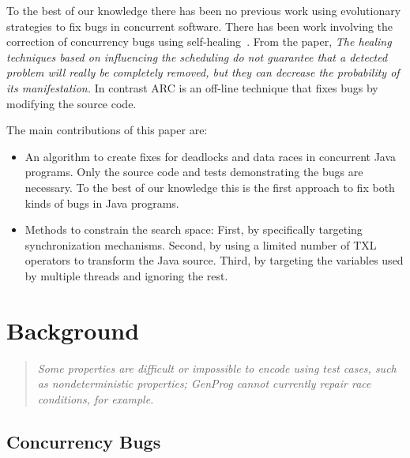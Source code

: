 \documentclass{llncs}
\begin{document}
To the best of our knowledge there has been no previous work using evolutionary
strategies to fix bugs in concurrent software. There has been work involving
the correction of concurrency bugs using self-healing~\cite{LVK08}. From the
paper, \textit{The healing techniques based on influencing the scheduling do
not guarantee that a detected problem will really be completely removed, but
they can decrease the probability of its manifestation.} In contrast ARC is an
off-line technique that fixes bugs by modifying the source code.

The main contributions of this paper are:

\begin{itemize}

\item An algorithm to create fixes for deadlocks and data races in concurrent Java
programs. Only the source code and tests demonstrating the bugs are necessary.
To the best of our knowledge this is the first approach to fix both kinds of
bugs in Java programs.

\item Methods to constrain the search space: First, by specifically targeting
synchronization mechanisms. Second, by using a limited number of TXL operators
to transform the Java source.  Third, by targeting the variables used by multiple
threads and ignoring the rest.

\end{itemize}

\section{Background}
\label{sec:background}

\begin{quote}
\textit{Some properties are difficult or impossible to encode using test cases,
such as nondeterministic properties; GenProg cannot currently repair race
conditions, for example.}~\cite{GNFW11}
\end{quote}


\subsection{Concurrency Bugs}
\label{sec:concurrency}
\end{document}
